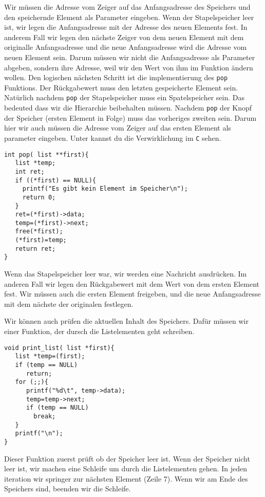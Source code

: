 Wir müssen die Adresse vom Zeiger auf das Anfangsadresse des Speichers und den speichernde 
Element als Parameter eingeben. Wenn der Stapelspeicher leer ist, wir legen die Anfangsadresse 
mit der Adresse des neuen Elements fest. In anderem Fall wir legen den nächste Zeiger von dem neuen 
Element mit dem originalle Anfangsadresse und die neue Anfangsadresse wird die Adresse vom neuen Element 
sein. Darum müssen wir nicht die Anfangsadresse als Parameter abgeben, sondern ihre Adresse,
weil wir den Wert von ihm im Funktion ändern wollen. Den logischen nächsten Schritt
ist die implementierung des \texttt{pop} Funktions. Der Rückgabewert muss den letzten gespeicherte
Element sein. Natürlich nachdem \texttt{pop} der Stapelspeicher muss ein Spatelspeicher sein. Das bedeuted
dass wir die Hierarchie beibehalten müssen. Nachdem \texttt{pop} der Knopf der Speicher (ersten Element in Folge)
muss das vorheriges zweiten sein. Darum hier wir auch müssen die Adresse vom Zeiger auf das ersten Element
als parameter eingeben. Unter kannst du die Verwirklichung im \texttt{C} sehen.
\begin{lstlisting}
int pop( list **first){
   list *temp;
   int ret;
   if ((*first) == NULL){
     printf("Es gibt kein Element im Speicher\n");
     return 0;
   }
   ret=(*first)->data;
   temp=(*first)->next;
   free(*first);
   (*first)=temp;
   return ret;
}
\end{lstlisting}
Wenn das Stapelspeicher leer war, wir werden eine Nachricht ausdrücken. 
Im anderen Fall wir legen den Rückgabewert mit dem Wert von dem ersten 
Element fest. Wir müssen auch die ersten Element freigeben, und die neue
Anfangsadresse mit dem nächste der originalen festlegen.

Wir können auch prüfen die aktuellen Inhalt des Speichers. 
Dafür müssen wir einer Funktion, der dursch die Listelementen geht
schreiben.
\begin{lstlisting}
void print_list( list *first){
   list *temp=(first);
   if (temp == NULL)
      return;
   for (;;){
      printf("%d\t", temp->data);
      temp=temp->next;
      if (temp == NULL)
        break;
   }
   printf("\n");
}
\end{lstlisting}
Dieser Funktion zuerst prüft ob der Speicher leer ist. Wenn der
Speicher nicht leer ist, wir machen eine Schleife um durch die
Listelementen gehen. In jeden iteration wir springer zur 
nächsten Element (Zeile 7). Wenn wir am Ende des Speichers
sind, beenden wir die Schleife.

